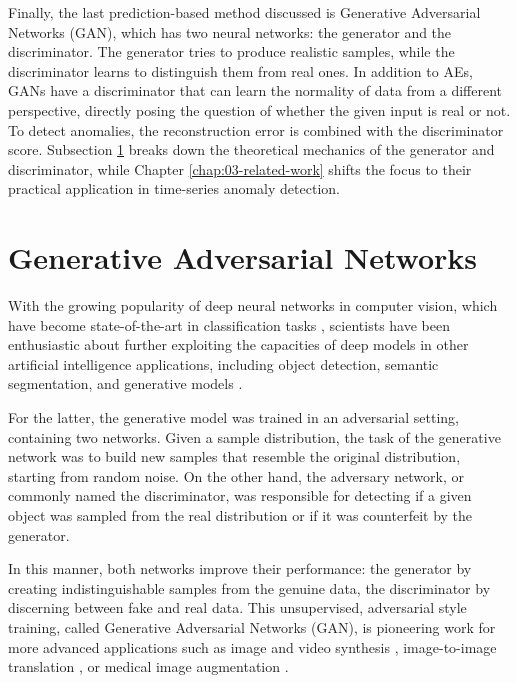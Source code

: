 Finally, the last prediction-based method discussed is Generative Adversarial Networks (GAN), which has two neural networks: the generator and the discriminator. The generator tries to produce realistic samples, while the discriminator learns to distinguish them from real ones. In addition to AEs, GANs have a discriminator that can learn the normality of data from a different perspective, directly posing the question of whether the given input is real or not. To detect anomalies, the reconstruction error is combined with the discriminator score. Subsection \ref{sec:gan} breaks down the theoretical mechanics of the generator and discriminator, while Chapter \ref{chap:03-related-work} shifts the focus to their practical application in time-series anomaly detection.


\section{Generative Adversarial Networks}
\label{sec:gan}

With the growing popularity of deep neural networks in computer vision, which have become state-of-the-art in classification tasks \cite{krizhevsky2012imagenet}, scientists have been enthusiastic about further exploiting the capacities of deep models in other artificial intelligence applications, including object detection, semantic segmentation, and generative models \cite{goodfellow2014gan}.

For the latter, the generative model was trained in an adversarial setting, containing two networks. Given a sample distribution, the task of the generative network was to build new samples that resemble the original distribution, starting from random noise. On the other hand, the adversary network, or commonly named the discriminator, was responsible for detecting if a given object was sampled from the real distribution or if it was counterfeit by the generator.

In this manner, both networks improve their performance: the generator by creating indistinguishable samples from the genuine data, the discriminator by discerning between fake and real data. This unsupervised, adversarial style training, called Generative Adversarial Networks (GAN), is pioneering work for more advanced applications such as image and video synthesis \cite{karras2019style-gan}, image-to-image translation \cite{zhu2017cyclegan}, or medical image augmentation \cite{skandarani2023gan_medical_img}. 

